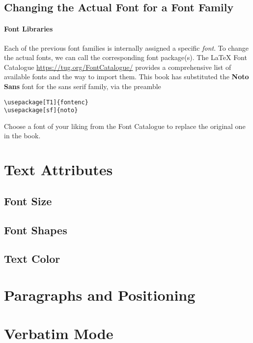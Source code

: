 \subsection{Changing the Actual Font for a Font Family}

\paragraph{Font Libraries}
Each of the previous font families is internally assigned a specific \textit{font}. To change the actual fonts, we can call the corresponding font package(s). The \LaTeX{} Font Catalogue \href{https://tug.org/FontCatalogue/}{https://tug.org/FontCatalogue/} provides a comprehensive list of available fonts and the way to import them. This book has substituted the \textbf{Noto Sans} font for the sans serif family, via the preamble
\begin{lstlisting}
\usepackage[T1]{fontenc}
\usepackage[sf]{noto}
\end{lstlisting}

\begin{exercisebox}
\begin{Exercise}
Choose a font of your liking from the Font Catalogue to replace the original one in the book.
\end{Exercise}
\end{exercisebox}

\section{Text Attributes}

\subsection{Font Size}

\subsection{Font Shapes}

\subsection{Text Color}

\section{Paragraphs and Positioning}

\section{Verbatim Mode}
